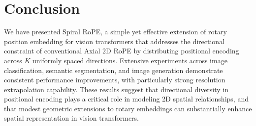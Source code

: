 
\section{Conclusion}
\label{sec:conclusion}

We have presented Spiral RoPE, a simple yet effective extension of rotary position embedding for vision transformers that addresses the directional constraint of conventional Axial 2D RoPE by distributing positional encoding across $K$ uniformly spaced directions. Extensive experiments across image classification, semantic segmentation, and image generation demonstrate consistent performance improvements, with particularly strong resolution extrapolation capability. These results suggest that directional diversity in positional encoding plays a critical role in modeling 2D spatial relationships, and that modest geometric extensions to rotary embeddings can substantially enhance spatial representation in vision transformers.
